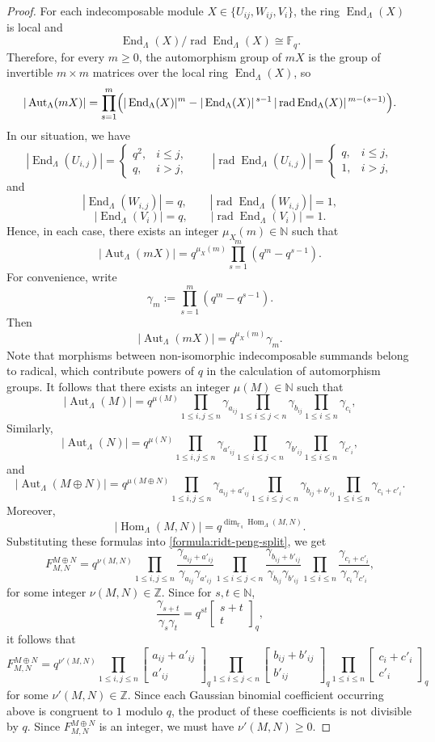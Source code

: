 \documentclass[12pt]{amsart}
\theoremstyle{remark}
\theoremstyle{definition}
\numberwithin{equation}{section}
\newcommand{\rad}{\operatorname{rad}\nolimits}
\newcommand{\Hom}{\operatorname{Hom}\nolimits}
\newcommand{\End}{\operatorname{End}\nolimits}
\newcommand{\sqbinom}[2]{\begin{bmatrix} #1 \\ #2 \end{bmatrix}}
\begin{document}
\begin{proof}
For each indecomposable module $X\in \{U_{ij},W_{ij},V_i\}$, the ring
$\End_\Lambda(X)$ is local and
\[
\End_\Lambda(X)/\rad\End_\Lambda(X)\cong \mathbb{F}_q.
\]
Therefore, for every $m\geq 0$, the automorphism group of $mX$ is
the group of invertible $m\times m$ matrices over the local ring $\End_\Lambda(X)$, so
\[
|\operatorname{Aut}_\Lambda(mX)|
=
\prod_{s=1}^m
\Bigl(
|\End_\Lambda(X)|^m
-
|\End_\Lambda(X)|^{\,s-1}\,
|\rad\End_\Lambda(X)|^{\,m-(s-1)}
\Bigr).
\]
In our situation, we have
\[
|\End_\Lambda(U_{i,j})|=
\begin{cases}
q^2, & i\leq j,\\
q, & i> j,
\end{cases}
\qquad
|\rad\End_\Lambda(U_{i,j})|=
\begin{cases}
q, & i\leq j,\\
1, & i> j,
\end{cases}
\]
and
\[
|\End_\Lambda(W_{i,j})|=q,\qquad |\rad\End_\Lambda(W_{i,j})|=1,
\]
\[
|\End_\Lambda(V_i)|=q,\qquad |\rad\End_\Lambda(V_i)|=1.
\]
Hence, in each case, there exists an integer $\mu_X(m)\in\mathbb{N}$ such that
\[
|\operatorname{Aut}_\Lambda(mX)|
=
q^{\mu_X(m)}\prod_{s=1}^m (q^m-q^{s-1}).
\]
For convenience, write
\[
\gamma_m:=\prod_{s=1}^m (q^m-q^{s-1}).
\]
Then
\[
|\operatorname{Aut}_\Lambda(mX)|=q^{\mu_X(m)}\gamma_m.
\]
Note that morphisms between non-isomorphic indecomposable summands belong to radical, which contribute powers of $q$ in the calculation of automorphism groups. It follows that there exists an integer $\mu(M)\in \mathbb{N}$ such that
\[
|\operatorname{Aut}_\Lambda(M)|
=
q^{\mu(M)}
\prod_{1\leq i,j\leq n}\gamma_{a_{ij}}
\prod_{1\leq i\leq j<n}\gamma_{b_{ij}}
\prod_{1\leq i\leq n}\gamma_{c_i},
\]
Similarly,
\[
|\operatorname{Aut}_\Lambda(N)|
=
q^{\mu(N)}
\prod_{1\leq i,j\leq n}\gamma_{a'_{ij}}
\prod_{1\leq i\leq j<n}\gamma_{b'_{ij}}
\prod_{1\leq i\leq n}\gamma_{c'_i},
\]
and
\[
|\operatorname{Aut}_\Lambda(M\oplus N)|
=
q^{\mu(M\oplus N)}
\prod_{1\leq i,j\leq n}\gamma_{a_{ij}+a'_{ij}}
\prod_{1\leq i\leq j<n}\gamma_{b_{ij}+b'_{ij}}
\prod_{1\leq i\leq n}\gamma_{c_i+c'_i}.
\]
Moreover,
\[
|\Hom_\Lambda(M,N)|=q^{\dim_{\mathbb{F}_q}\Hom_\Lambda(M,N)}.
\]
Substituting these formulas into \eqref{formula:ridt-peng-split}, we get
\[
F_{M,N}^{M\oplus N}
=
q^{\nu(M,N)}
\prod_{1\leq i,j\leq n}
\frac{\gamma_{a_{ij}+a'_{ij}}}{\gamma_{a_{ij}}\gamma_{a'_{ij}}}
\prod_{1\leq i\leq j<n}
\frac{\gamma_{b_{ij}+b'_{ij}}}{\gamma_{b_{ij}}\gamma_{b'_{ij}}}
\prod_{1\leq i\leq n}
\frac{\gamma_{c_i+c'_i}}{\gamma_{c_i}\gamma_{c'_i}},
\]
for some integer $\nu(M,N)\in\mathbb{Z}$.
Since for $s,t\in \mathbb{N}$,
\[
\frac{\gamma_{s+t}}{\gamma_s\gamma_t}
=
q^{st}\sqbinom{s+t}{t}_q,
\]
it follows that
\[
F_{M,N}^{M\oplus N}
=
q^{\nu'(M,N)}
\prod_{1\leq i,j\leq n}\sqbinom{a_{ij}+a'_{ij}}{a'_{ij}}_q
\prod_{1\leq i\leq j<n}\sqbinom{b_{ij}+b'_{ij}}{b'_{ij}}_q
\prod_{1\leq i\leq n}\sqbinom{c_i+c'_i}{c'_i}_q
\]
for some 
$\nu'(M,N)\in\mathbb{Z}$.  Since each Gaussian binomial coefficient occurring above is congruent to $1$ modulo $q$, the product of these coefficients is not divisible by $q$. Since $F^{M\oplus N}_{M,N}$ is an integer, we must have $\nu'(M,N)\ge 0$.


\end{proof}
\end{document}

